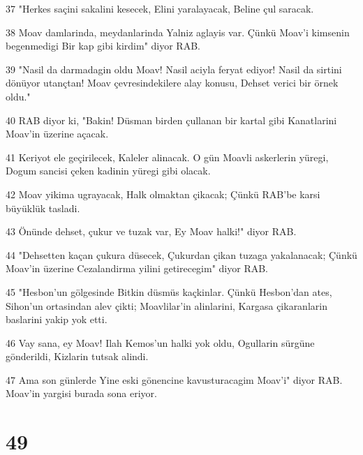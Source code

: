 \par 37 "Herkes saçini sakalini kesecek, Elini yaralayacak, Beline çul saracak.
\par 38 Moav damlarinda, meydanlarinda Yalniz aglayis var. Çünkü Moav'i kimsenin begenmedigi Bir kap gibi kirdim" diyor RAB.
\par 39 "Nasil da darmadagin oldu Moav! Nasil aciyla feryat ediyor! Nasil da sirtini dönüyor utançtan! Moav çevresindekilere alay konusu, Dehset verici bir örnek oldu."
\par 40 RAB diyor ki, "Bakin! Düsman birden çullanan bir kartal gibi Kanatlarini Moav'in üzerine açacak.
\par 41 Keriyot ele geçirilecek, Kaleler alinacak. O gün Moavli askerlerin yüregi, Dogum sancisi çeken kadinin yüregi gibi olacak.
\par 42 Moav yikima ugrayacak, Halk olmaktan çikacak; Çünkü RAB'be karsi büyüklük tasladi.
\par 43 Önünde dehset, çukur ve tuzak var, Ey Moav halki!" diyor RAB.
\par 44 "Dehsetten kaçan çukura düsecek, Çukurdan çikan tuzaga yakalanacak; Çünkü Moav'in üzerine Cezalandirma yilini getirecegim" diyor RAB.
\par 45 "Hesbon'un gölgesinde Bitkin düsmüs kaçkinlar. Çünkü Hesbon'dan ates, Sihon'un ortasindan alev çikti; Moavlilar'in alinlarini, Kargasa çikaranlarin baslarini yakip yok etti.
\par 46 Vay sana, ey Moav! Ilah Kemos'un halki yok oldu, Ogullarin sürgüne gönderildi, Kizlarin tutsak alindi.
\par 47 Ama son günlerde Yine eski gönencine kavusturacagim Moav'i" diyor RAB. Moav'in yargisi burada sona eriyor.

\chapter{49}

